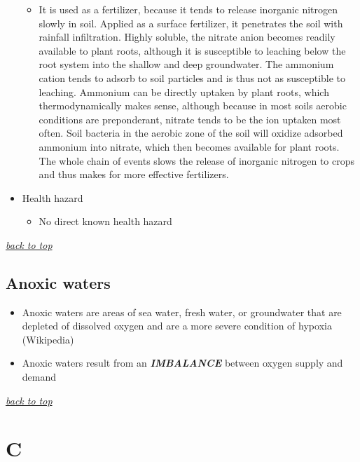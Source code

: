 \documentclass[]{book}
\providecommand{\tightlist}{%
  \setlength{\itemsep}{0pt}\setlength{\parskip}{0pt}}
\theoremstyle{definition}
\theoremstyle{definition}
\theoremstyle{definition}
\theoremstyle{remark}
\begin{document}
\begin{itemize}
  \begin{itemize}
  \tightlist
  \item
    It is used as a fertilizer, because it tends to release inorganic
    nitrogen slowly in soil. Applied as a surface fertilizer, it
    penetrates the soil with rainfall infiltration. Highly soluble, the
    nitrate anion becomes readily available to plant roots, although it
    is susceptible to leaching below the root system into the shallow
    and deep groundwater. The ammonium cation tends to adsorb to soil
    particles and is thus not as susceptible to leaching. Ammonium can
    be directly uptaken by plant roots, which thermodynamically makes
    sense, although because in most soils aerobic conditions are
    preponderant, nitrate tends to be the ion uptaken most often. Soil
    bacteria in the aerobic zone of the soil will oxidize adsorbed
    ammonium into nitrate, which then becomes available for plant roots.
    The whole chain of events slows the release of inorganic nitrogen to
    crops and thus makes for more effective fertilizers.
  \end{itemize}
\item
  Health hazard

  \begin{itemize}
  \tightlist
  \item
    No direct known health hazard
  \end{itemize}
\end{itemize}

\emph{\protect\hyperlink{top}{back to top}}

\subsection{Anoxic waters}\label{anoxic-waters}

\begin{itemize}
\tightlist
\item
  Anoxic waters are areas of sea water, fresh water, or groundwater that
  are depleted of dissolved oxygen and are a more severe condition of
  hypoxia (Wikipedia)
\item
  Anoxic waters result from an \emph{\textbf{IMBALANCE}} between oxygen
  supply and demand
\end{itemize}

\emph{\protect\hyperlink{top}{back to top}}

\section{C}\label{c}
\end{document}
